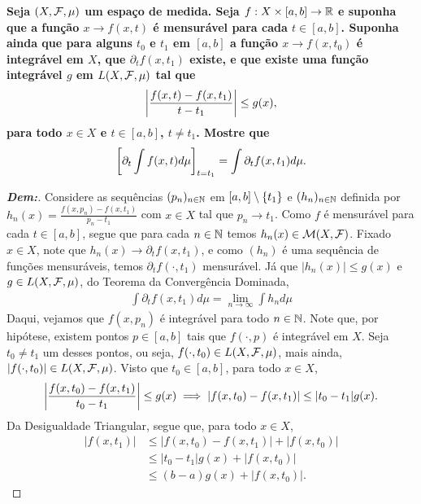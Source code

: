 \textbf{Seja $(X, \mathcal F, \mu)$ um espaço de medida. Seja 
$f: X \times [a, b] \rightarrow \mathbb R$ e suponha que a função $x \rightarrow f(x, t)$
é mensurável para cada $t \in [a, b]$. Suponha ainda que para alguns $t_0$ 
e $t_1$ em $[a, b]$ a função $x \rightarrow f(x, t_0)$ é integrável em $X$, 
que $\partial_t f(x, t_1)$ existe, e que existe uma função integrável $g$ em 
$L(X, \mathcal F, \mu)$ tal que 
\begin{align*}
  \left|\frac{f(x, t) - f(x, t_1)}{t - t_1}\right| \le g(x),
\end{align*}
para todo $x \in X$ e $t \in [a, b]$, $t \neq t_1$. Mostre que 
\begin{align*}
  \left[\partial_t \int f(x, t) d\mu\right]_{t = t_1} = \int \partial_t f(x, t_1) d\mu.
\end{align*}}
\begin{proof}[\textbf{Dem:}]Considere as sequências $(p_n)_{n \in \mathbb N}$ em $[a, b]\setminus\left\{t_1\right\}$
  e $(h_n)_{n \in \mathbb N}$ definida por $h_n(x) = \frac{f(x,p_n) - f(x, t_1)}{p_n-t_1}$ com $x \in X$ tal que 
  $p_n \rightarrow t_1$. Como $f$ é mensurável para cada $t \in [a,b]$, segue que para cada 
  $n \in \mathbb N$ temos $h_n(x) \in \mathcal M(X, \mathcal F)$. Fixado $x \in X$, note que 
  $h_n(x) \rightarrow \partial_t f(x, t_1)$, e como $(h_n)$ é uma sequência de funções mensuráveis,
  temos $\partial_t f(\cdot, t_1)$ mensurável. Já que $|h_n(x)| \le g(x)$ e $g \in L(X, \mathcal F, \mu)$,
  do Teorema da Convergência Dominada, 
  \begin{align*}
    \int \partial_t f(x, t_1) d\mu = \lim_{n \rightarrow \infty} \int h_n d\mu
  \end{align*}
  Daqui, vejamos que $f(x, p_n)$ é integrável para todo $n \in \mathbb N$. Note que, por hipótese, 
  existem pontos $p \in [a, b]$ tais que $f(\cdot, p)$ é integrável em $X$. Seja $t_0 \neq t_1$
  um desses pontos, ou seja,
  $f(\cdot, t_0) \in L(X, \mathcal F, \mu)$, mais ainda, $|f(\cdot, t_0)|\in L(X,\mathcal F, \mu)$.
  Visto que $t_0 \in [a, b]$, para todo $x \in X$, 
  \begin{align*}
    \left|\frac{f(x, t_0) - f(x, t_1)}{t_0 - t_1}\right| \le g(x) \implies |f(x, t_0) - f(x, t_1)| \le |t_0 - t_1|g(x).
  \end{align*}
  Da Desigualdade Triangular, segue que, para todo $x \in X$,
  \begin{align*}
    |f(x, t_1)| &\le |f(x, t_0) - f(x, t_1)| + |f(x, t_0)|\\
    &\le |t_0 - t_1|g(x) + |f(x, t_0)|\\
    &\le (b-a)g(x) + |f(x, t_0)|.

\end{align*}
\end{proof}
